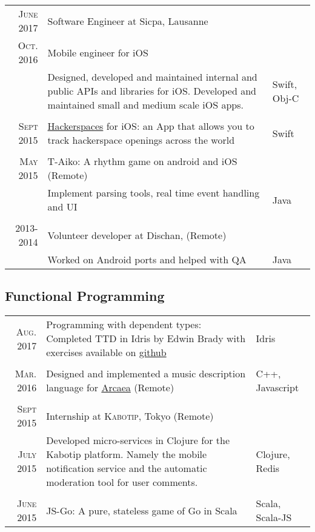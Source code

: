 \documentclass[a4paper,10pt]{article} %
\begin{document}
\begin{tabular}{r|p{9.3cm}|l}
\textsc{June 2017} & Software Engineer at Sicpa, Lausanne\\
\textsc{Oct. 2016} & Mobile engineer for iOS\\ 
& \footnotesize{Designed, developed and maintained internal and public APIs and libraries for iOS. Developed and maintained small and medium scale iOS apps.} & Swift, Obj-C\\
\\
\textsc{Sept} 2015 & \href{https://itunes.apple.com/us/app/hackerspaces/id1035583993?ls=1&mt=8}{Hackerspaces} for iOS: an App that allows you to track hackerspace openings across the world & Swift\\\\

\textsc{May} 2015 & T-Aiko: A rhythm game on android and iOS (Remote) & \\
& \footnotesize{Implement parsing tools, real time event handling and UI} & Java\\\\

\textsc{2013-2014} & Volunteer developer at Dischan, (Remote)\\
& \footnotesize{Worked on Android ports and helped with QA} & Java
\end{tabular}

\subsection{Functional Programming}

\begin{tabular}{r|p{9.3cm}|l}

\textsc{Aug.} 2017 & Programming with dependent types: Completed TTD in Idris by Edwin Brady with exercises available on \href{https://github.com/andrevidela/Type_Driven_Dev-Idris}{github} & Idris\\\\

\textsc{Mar.} 2016 & Designed and implemented a music description language for \href{https://arcaea.lowiro.com}{Arcaea} (Remote) & C++, Javascript\\\\


\textsc{Sept 2015} & Internship at \textsc{Kabotip}, Tokyo (Remote) \emph{}\\
\textsc{July 2015} & \footnotesize{Developed micro-services in Clojure for the Kabotip platform. Namely the mobile notification service and the automatic moderation tool for user comments.} & Clojure, Redis\\\\

\textsc{June 2015} & JS-Go: A pure, stateless game of Go in Scala & Scala, Scala-JS\\

\end{tabular}
\end{document}

